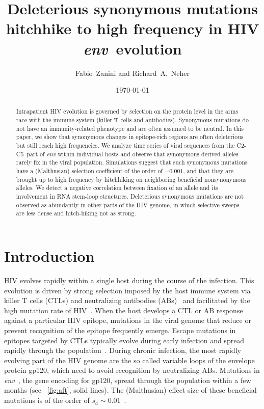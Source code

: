 \documentclass[rmp, twocolumn]{revtex4}
\newcommand{\env}{\textit{env}}
\newcommand{\shankaregion}{C2-C5}
\newcommand{\Author}{Fabio~Zanini and Richard~A.~Neher}
\newcommand{\Title}{Deleterious synonymous mutations hitchhike to high frequency in HIV \env~evolution}
\begin{document}
\title{\Title}
\author{\Author}
\date{\today}

\begin{abstract}
\noindent
Intrapatient HIV evolution is governed by selection on the protein level in the
arms race with the immune system (killer T-cells and antibodies). Synonymous
mutations do not have an immunity-related phenotype and are often assumed to be
neutral. In this paper, we show that synonymous changes in epitope-rich regions
are often deleterious but still reach high frequencies.  We analyze time
series of viral sequences from the \shankaregion~part of {\it env} within individual
hosts and observe that synonymous derived alleles rarely fix in the
viral population. Simulations suggest that such synonymous mutations
have a (Malthusian) selection coefficient of the order of $-0.001$, and that
they are brought up to high frequency by hitchhiking on neighboring beneficial
nonsynonymous alleles. We detect a negative correlation between fixation of an allele and
its involvement in RNA stem-loop structures.
Deleterious synonymous mutations are not observed as abundantly in other parts of the HIV genome, in which
selective sweeps are less dense and hitch-hiking not as strong.

\end{abstract}
\maketitle

\section{Introduction}

HIV evolves rapidly within a single host during the course of the infection.
This evolution is driven by strong selection imposed by the host immune system
via killer T cells (CTLs) and neutralizing antibodies
(ABs)~\citep{pantaleo_immunopathogenesis_1996} and facilitated by the high
mutation rate of HIV~\citep{mansky_lower_1995}. When the host develops a CTL or
AB response against a particular HIV epitope, mutations in the viral genome that
reduce or prevent recognition of the epitope frequently emerge. Escape mutations
in epitopes targeted by CTLs typically evolve during early infection and spread
rapidly through the population~\citep{mcmichael_immune_2009}. During chronic
infection, the most rapidly evolving part of the HIV genome are the so called
variable loops of the envelope protein gp120, which need to avoid recognition by
neutralizing ABs.  Mutations in \env~, the gene encoding for gp120, spread
through the population within a few months (see \figurename~\ref{fig:aft}, solid
lines).  The (Malthusian) effect size of these beneficial mutations is of the
order of $s_a \sim 0.01$~\citep{neher_recombination_2010}.
\end{document}
